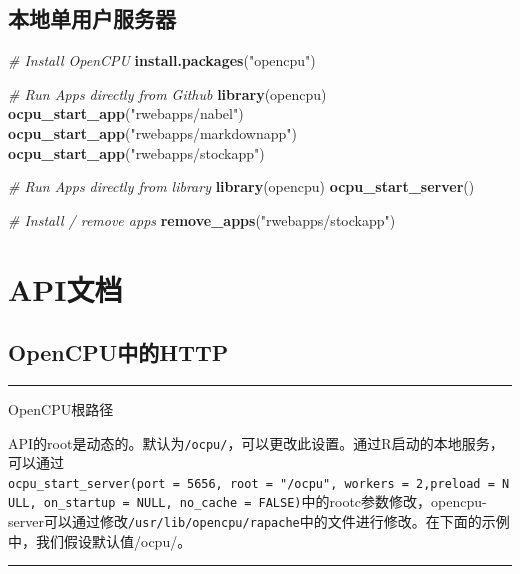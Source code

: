 \documentclass[]{book}
\newenvironment{Shaded}{\begin{snugshade}}{\end{snugshade}}
\newcommand{\KeywordTok}[1]{\textcolor[rgb]{0.13,0.29,0.53}{\textbf{#1}}}
\newcommand{\StringTok}[1]{\textcolor[rgb]{0.31,0.60,0.02}{#1}}
\newcommand{\CommentTok}[1]{\textcolor[rgb]{0.56,0.35,0.01}{\textit{#1}}}
\newcommand{\NormalTok}[1]{#1}
\begin{document}
\subsection{本地单用户服务器}

\begin{Shaded}
\begin{Highlighting}[]
\CommentTok{# Install OpenCPU}
\KeywordTok{install.packages}\NormalTok{(}\StringTok{"opencpu"}\NormalTok{)}

\CommentTok{# Run Apps directly from Github}
\KeywordTok{library}\NormalTok{(opencpu)}
\KeywordTok{ocpu_start_app}\NormalTok{(}\StringTok{"rwebapps/nabel"}\NormalTok{)}
\KeywordTok{ocpu_start_app}\NormalTok{(}\StringTok{"rwebapps/markdownapp"}\NormalTok{)}
\KeywordTok{ocpu_start_app}\NormalTok{(}\StringTok{"rwebapps/stockapp"}\NormalTok{)}

\CommentTok{# Run Apps directly from library}
\KeywordTok{library}\NormalTok{(opencpu)}
\KeywordTok{ocpu_start_server}\NormalTok{()}

\CommentTok{# Install / remove apps}
\KeywordTok{remove_apps}\NormalTok{(}\StringTok{"rwebapps/stockapp"}\NormalTok{)}
\end{Highlighting}
\end{Shaded}

\section{API文档}\label{api}

\subsection{OpenCPU中的HTTP}\label{opencpuhttp}

\begin{center}\rule{0.5\linewidth}{\linethickness}\end{center}

OpenCPU根路径

API的root是动态的。默认为\texttt{/ocpu/}，可以更改此设置。通过R启动的本地服务，可以通过\texttt{ocpu\_start\_server(port\ =\ 5656,\ root\ =\ "/ocpu",\ workers\ =\ 2,preload\ =\ NULL,\ on\_startup\ =\ NULL,\ no\_cache\ =\ FALSE)}中的rootc参数修改，opencpu-server可以通过修改\texttt{/usr/lib/opencpu/rapache}中的文件进行修改。在下面的示例中，我们假设默认值/ocpu/。

\begin{center}\rule{0.5\linewidth}{\linethickness}\end{center}
\end{document}
